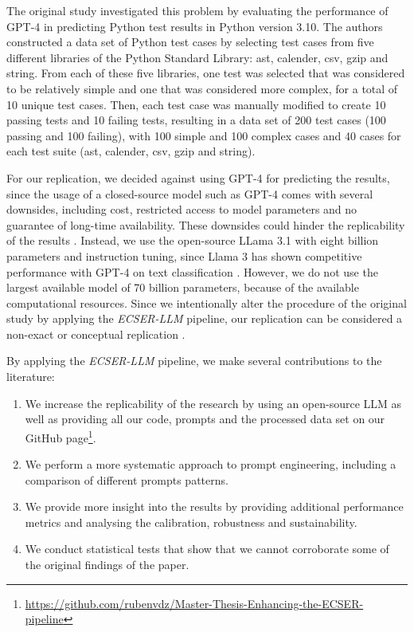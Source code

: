 \documentclass[a4paper]{article}
\newcommand{\newecser}{\textit{ECSER-LLM} }
\begin{document}
The original study investigated this problem by evaluating the performance of GPT-4 in predicting Python test results in Python version 3.10. The authors constructed a data set of Python test cases by selecting test cases from five different libraries of the Python Standard Library: ast, calender, csv, gzip and string. From each of these five libraries, one test was selected that was considered to be relatively simple and one that was considered more complex, for a total of 10 unique test cases. Then, each test case was manually modified to create 10 passing tests and 10 failing tests, resulting in a data set of 200 test cases (100 passing and 100 failing), with 100 simple and 100 complex cases and 40 cases for each test suite (ast, calender, csv, gzip and string). 

For our replication, we decided against using GPT-4 for predicting the results, since the usage of a closed-source model such as GPT-4 comes with several downsides, including cost, restricted access to model parameters and no guarantee of long-time availability. These downsides could hinder the replicability of the results \cite{baltes2025guidelinesempiricalstudiessoftware}. Instead, we use the open-source LLama 3.1 with eight billion parameters and instruction tuning, since Llama 3 has shown competitive performance with GPT-4 on text classification \cite{kostina2025llama}. However, we do not use the largest available model of 70 billion parameters, because of the available computational resources. Since we intentionally alter the procedure of the original study by applying the \newecser pipeline, our replication can be considered a non-exact or conceptual replication \cite{Shull2008}.

By applying the \newecser pipeline, we make several contributions to the literature: 
\begin{enumerate}
\item We increase the replicability of the research by using an open-source LLM as well as providing all our code, prompts and the processed data set on our GitHub page\footnote{\url{https://github.com/rubenvdz/Master-Thesis-Enhancing-the-ECSER-pipeline}}.
\item We perform a more systematic approach to prompt engineering, including a comparison of different prompts patterns.
\item We provide more insight into the results by providing additional performance metrics and analysing the calibration, robustness and sustainability.
\item We conduct statistical tests that show that we cannot corroborate some of the original findings of the paper.
\end{enumerate}
\end{document}
